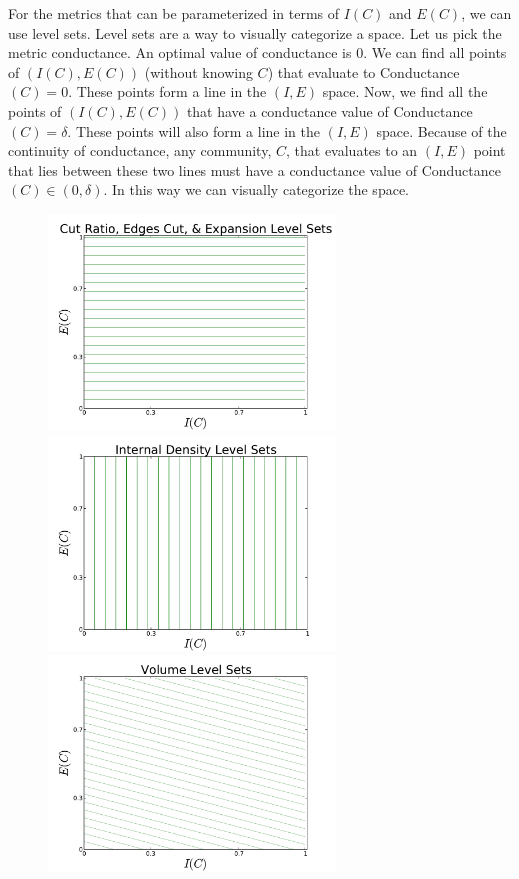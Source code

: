 \documentclass[phd,tocprelim]{cornell}
\begin{document}
For the metrics that can be parameterized in terms of $I(C)$ and $E(C)$, we can use level sets.  Level sets are a way to visually categorize a space.  Let us pick the metric conductance.  An optimal value of conductance is $0$.  We can find all points of $(I(C), E(C))$ (without knowing $C$) that evaluate to {\sc Conductance}$(C) = 0$.  These points form a line in the $(I, E)$ space.  Now, we find all the points of $(I(C), E(C))$ that have a conductance value of {\sc Conductance}$(C) = \delta$.  These points will also form a line in the $(I, E)$ space.  Because of the continuity of conductance, any community, $C$, that evaluates to an $(I, E)$ point that lies between these two lines must have a conductance value of {\sc Conductance}$(C) \in (0, \delta)$.  In this way we can visually categorize the space.

\begin{figure}
\includegraphics[width=3in]{Figures/e_based_ls}
\includegraphics[width=3in]{Figures/prev_int_ls}
\includegraphics[width=3in]{Figures/volume_ls}

\end{figure}
\end{document}
